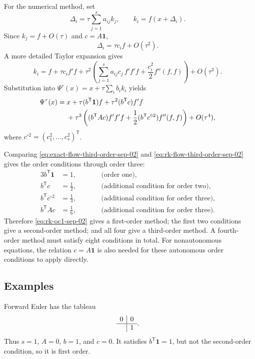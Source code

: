 For the numerical method, set
\[
  \Delta_i=\tau\sum_{j=1}^s a_{ij}k_j,
  \qquad
  k_i=f(x+\Delta_i).
\]
Since \(k_j=f+O(\tau)\) and \(c=A\mathbf{1}\),
\[
  \Delta_i=\tau c_i f+O(\tau^2).
\]
A more detailed Taylor expansion gives
\[
  k_i
  =f+\tau c_i f'f
   +\tau^2\left(
     \sum_{j=1}^s a_{ij}c_j\,f'f'f
     +\frac{c_i^2}{2}f''(f,f)
   \right)
   +O(\tau^3).
\]
Substitution into \(\Psi^\tau(x)=x+\tau\sum_i b_i k_i\) yields
\begin{align}
  \Psi^\tau(x)
  ={}&x+\tau(b^{\mathsf T}\mathbf{1})f
  +\tau^2(b^{\mathsf T}c)f'f\notag\\
  &+\tau^3\left(
    (b^{\mathsf T}Ac)f'f'f
    +\frac12(b^{\mathsf T}c^{\circ2})f''(f,f)
  \right)
  +O(\tau^4),
  \label{eq:rk-flow-third-order-sep-02}
\end{align}
where \(c^{\circ2}=(c_1^2,\ldots,c_s^2)^{\mathsf T}\).

Comparing \eqref{eq:exact-flow-third-order-sep-02} and
\eqref{eq:rk-flow-third-order-sep-02} gives the order conditions through
order three:
\begin{alignat}{3}
  b^{\mathsf T}\mathbf{1}&=1,
  &\qquad&\text{(order one)},
  \label{eq:rk-oc1-sep-02}\\
  b^{\mathsf T}c&=\frac12,
  &&\text{(additional condition for order two)},
  \label{eq:rk-oc2-sep-02}\\
  b^{\mathsf T}c^{\circ2}&=\frac13,
  &&\text{(additional condition for order three)},
  \label{eq:rk-oc3-sep-02}\\
  b^{\mathsf T}Ac&=\frac16,
  &&\text{(additional condition for order three)}.
  \label{eq:rk-oc4-sep-02}
\end{alignat}
Therefore \eqref{eq:rk-oc1-sep-02} gives a first-order method; the first
two conditions give a second-order method; and all four give a
third-order method. A fourth-order method must satisfy eight conditions
in total. For nonautonomous equations, the relation
\(c=A\mathbf{1}\) is also needed for these autonomous order conditions
to apply directly.

\subsection{Examples}

\begin{example}
  Forward Euler has the tableau
  \[
    \begin{array}{c|c}
      0&0\\ \hline
       &1
    \end{array}.
  \]
  Thus \(s=1\), \(A=0\), \(b=1\), and \(c=0\). It satisfies
  \(b^{\mathsf T}\mathbf{1}=1\), but not the second-order condition,
  so it is first order.
\end{example}

